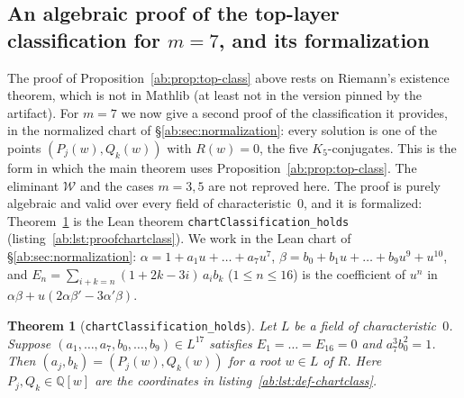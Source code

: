 \documentclass[a4paper,11pt]{article}
\theoremstyle{plain}
\newtheorem{theorem}{Theorem}[section]
\theoremstyle{definition}
\theoremstyle{remark}
\begin{document}
\subsection{An algebraic proof of the top-layer classification for $m=7$, and its formalization}\label{ab:sec:chartproof}

The proof of Proposition~\ref{ab:prop:top-class} above rests on Riemann's existence theorem, which is not in Mathlib (at least not in the version pinned by the artifact). For $m=7$ we now give a second proof of the classification it provides, in the normalized chart of \S\ref{ab:sec:normalization}: every solution is one of the points $(P_j(w),Q_k(w))$ with $R(w)=0$, the five $K_5$-conjugates. This is the form in which the main theorem uses Proposition~\ref{ab:prop:top-class}. The eliminant $\mathcal{W}$ and the cases $m=3,5$ are not reproved here. The proof is purely algebraic and valid over every field of characteristic~$0$, and it is formalized: Theorem~\ref{ab:thm:chartclass} is the Lean theorem \texttt{chartClassification\_holds} (listing~\ref{ab:lst:proofchartclass}). We work in the Lean chart of \S\ref{ab:sec:normalization}: $\alpha=1+a_1u+\dots+a_7u^7$, $\beta=b_0+b_1u+\dots+b_9u^9+u^{10}$, and $E_n=\sum_{i+k=n}(1+2k-3i)\,a_ib_k$ ($1\le n\le 16$) is the coefficient of $u^n$ in $\alpha\beta+u(2\alpha\beta'-3\alpha'\beta)$.

\begin{theorem}[\texttt{chartClassification\_holds}]\label{ab:thm:chartclass}
Let $L$ be a field of characteristic~$0$. Suppose $(a_1,\dots,a_7,b_0,\dots,b_9)\in L^{17}$ satisfies $E_1=\dots=E_{16}=0$ and $a_7^3b_0^2=1$. Then $(a_j,b_k)=(P_j(w),Q_k(w))$ for a root $w\in L$ of $R$. Here $P_j,Q_k\in\mathbb{Q}[w]$ are the coordinates in listing~\ref{ab:lst:def-chartclass}.
\end{theorem}
\end{document}
